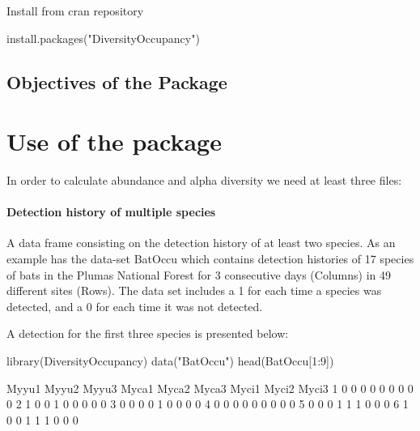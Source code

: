 \documentclass[article]{jss}
\begin{document}
Install from cran repository

\begin{CodeChunk}
\begin{CodeInput}
install.packages("DiversityOccupancy")
\end{CodeInput}
\end{CodeChunk}

\subsection{Objectives of the Package}\label{objectives-of-the-package}

\section{Use of the package}\label{use-of-the-package}

In order to calculate abundance and alpha diversity we need at least
three files:

\paragraph{Detection history of multiple
species}\label{detection-history-of-multiple-species}

A data frame consisting on the detection history of at least two
species. As an example  has the data-set BatOccu
which contains detection histories of 17 species of bats in the Plumas
National Forest for 3 consecutive days (Columns) in 49 different sites
(Rows). The data set includes a 1 for each time a species was detected,
and a 0 for each time it was not detected.

A detection for the first three species is presented below:

\begin{CodeChunk}
\begin{CodeInput}
library(DiversityOccupancy)
data("BatOccu")
head(BatOccu[1:9])
\end{CodeInput}
\begin{CodeOutput}
  Myyu1 Myyu2 Myyu3 Myca1 Myca2 Myca3 Myci1 Myci2 Myci3
1     0     0     0     0     0     0     0     0     0
2     1     0     0     1     0     0     0     0     0
3     0     0     0     0     1     0     0     0     0
4     0     0     0     0     0     0     0     0     0
5     0     0     0     1     1     1     0     0     0
6     1     0     0     1     1     1     0     0     0
\end{CodeOutput}
\end{CodeChunk}
\end{document}
